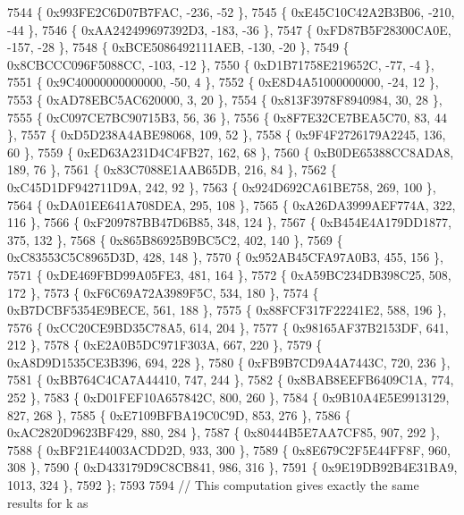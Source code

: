 \begin{DoxyCode}
7544         \{ 0x993FE2C6D07B7FAC,  -236,  -52 \},
7545         \{ 0xE45C10C42A2B3B06,  -210,  -44 \},
7546         \{ 0xAA242499697392D3,  -183,  -36 \},
7547         \{ 0xFD87B5F28300CA0E,  -157,  -28 \},
7548         \{ 0xBCE5086492111AEB,  -130,  -20 \},
7549         \{ 0x8CBCCC096F5088CC,  -103,  -12 \},
7550         \{ 0xD1B71758E219652C,   -77,   -4 \},
7551         \{ 0x9C40000000000000,   -50,    4 \},
7552         \{ 0xE8D4A51000000000,   -24,   12 \},
7553         \{ 0xAD78EBC5AC620000,     3,   20 \},
7554         \{ 0x813F3978F8940984,    30,   28 \},
7555         \{ 0xC097CE7BC90715B3,    56,   36 \},
7556         \{ 0x8F7E32CE7BEA5C70,    83,   44 \},
7557         \{ 0xD5D238A4ABE98068,   109,   52 \},
7558         \{ 0x9F4F2726179A2245,   136,   60 \},
7559         \{ 0xED63A231D4C4FB27,   162,   68 \},
7560         \{ 0xB0DE65388CC8ADA8,   189,   76 \},
7561         \{ 0x83C7088E1AAB65DB,   216,   84 \},
7562         \{ 0xC45D1DF942711D9A,   242,   92 \},
7563         \{ 0x924D692CA61BE758,   269,  100 \},
7564         \{ 0xDA01EE641A708DEA,   295,  108 \},
7565         \{ 0xA26DA3999AEF774A,   322,  116 \},
7566         \{ 0xF209787BB47D6B85,   348,  124 \},
7567         \{ 0xB454E4A179DD1877,   375,  132 \},
7568         \{ 0x865B86925B9BC5C2,   402,  140 \},
7569         \{ 0xC83553C5C8965D3D,   428,  148 \},
7570         \{ 0x952AB45CFA97A0B3,   455,  156 \},
7571         \{ 0xDE469FBD99A05FE3,   481,  164 \},
7572         \{ 0xA59BC234DB398C25,   508,  172 \},
7573         \{ 0xF6C69A72A3989F5C,   534,  180 \},
7574         \{ 0xB7DCBF5354E9BECE,   561,  188 \},
7575         \{ 0x88FCF317F22241E2,   588,  196 \},
7576         \{ 0xCC20CE9BD35C78A5,   614,  204 \},
7577         \{ 0x98165AF37B2153DF,   641,  212 \},
7578         \{ 0xE2A0B5DC971F303A,   667,  220 \},
7579         \{ 0xA8D9D1535CE3B396,   694,  228 \},
7580         \{ 0xFB9B7CD9A4A7443C,   720,  236 \},
7581         \{ 0xBB764C4CA7A44410,   747,  244 \},
7582         \{ 0x8BAB8EEFB6409C1A,   774,  252 \},
7583         \{ 0xD01FEF10A657842C,   800,  260 \},
7584         \{ 0x9B10A4E5E9913129,   827,  268 \},
7585         \{ 0xE7109BFBA19C0C9D,   853,  276 \},
7586         \{ 0xAC2820D9623BF429,   880,  284 \},
7587         \{ 0x80444B5E7AA7CF85,   907,  292 \},
7588         \{ 0xBF21E44003ACDD2D,   933,  300 \},
7589         \{ 0x8E679C2F5E44FF8F,   960,  308 \},
7590         \{ 0xD433179D9C8CB841,   986,  316 \},
7591         \{ 0x9E19DB92B4E31BA9,  1013,  324 \},
7592     \};
7593 
7594     \textcolor{comment}{// This computation gives exactly the same results for k as}

\end{DoxyCode}
